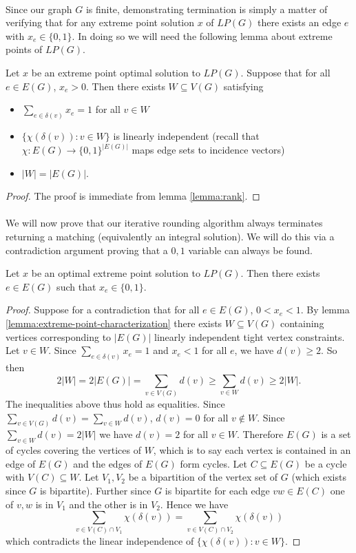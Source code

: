 \paragraph{} Since our graph $G$ is finite, demonstrating termination is simply a matter of verifying that for any extreme point solution $x$ of $LP(G)$ there exists an edge $e$ with $x_e \in \{0,1\}$. In doing so we will need the following lemma about extreme points of $LP(G)$.
\begin{lemma}\label{lemma:extreme-point-characterization} Let $x$ be an extreme point optimal solution to $LP(G)$. Suppose that for all $e \in E(G)$, $x_e > 0$. Then there exists $W \subseteq V(G)$ satisfying
\begin{itemize}
\item $\sum_{e\in\delta(v)} x_e = 1$ for all $v \in W$ \\
\item $\{\chi(\delta(v)) : v \in W\}$ is linearly independent (recall that $\chi : E(G)\rightarrow \{0,1\}^{|E(G)|}$ maps edge sets to incidence vectors)
\item $|W| = |E(G)|$.
\end{itemize} 
\end{lemma}
\begin{proof}
The proof is immediate from lemma \ref{lemma:rank}.
\end{proof}
\paragraph{} We will now prove that our iterative rounding algorithm always terminates returning a matching (equivalently an integral solution). We will do this via a contradiction argument proving that a $0,1$ variable can always be found.
\begin{lemma} Let $x$ be an optimal extreme point solution to $LP(G)$. Then there exists $e \in E(G)$ such that $x_e \in \{0,1\}$.
\end{lemma}
\begin{proof}
Suppose for a contradiction that for all $e\in E(G)$, $0 < x_e < 1$. By lemma \ref{lemma:extreme-point-characterization} there exists $W \subseteq V(G)$ containing vertices corresponding to $|E(G)|$ linearly independent tight vertex constraints. Let $v \in W$. Since $\sum_{e\in \delta(v)} x_e = 1$ and $x_e < 1$ for all $e$, we have $d(v) \geq 2$. So then
$$2|W| = 2|E(G)| = \sum_{v \in V(G)} d(v) \geq \sum_{v\in W} d(v) \geq 2|W|.$$
The inequalities above thus hold as equalities. Since $\sum_{v\in V(G)} d(v) = \sum_{v \in W} d(v)$, $d(v) = 0$ for all $v \not\in W$. Since $\sum_{v \in W} d(v) = 2|W|$ we have $d(v) = 2$ for all $v \in W$. Therefore $E(G)$ is a set of cycles covering the vertices of $W$, which is to say each vertex is contained in an edge of $E(G)$ and the edges of $E(G)$ form cycles. Let $C \subseteq E(G)$ be a cycle with $V(C) \subseteq W$. Let $V_1, V_2$ be a bipartition of the vertex set of $G$ (which exists since $G$ is bipartite). Further since $G$ is bipartite for each edge $vw \in E(C)$ one of $v,w $ is in $V_1$ and the other is in $V_2$. Hence we have
$$\sum_{v \in V(C) \cap V_1} \chi(\delta(v)) = \sum_{v\in V(C) \cap V_2} \chi(\delta(v))$$
which contradicts the linear independence of $\{\chi(\delta(v)) : v \in W\}$.
\end{proof}
